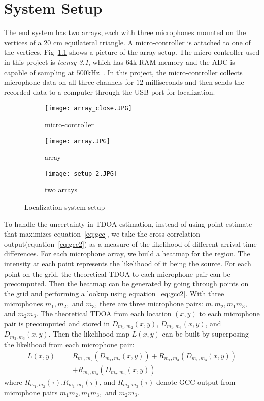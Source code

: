 \chapter{System Setup}
The end system has two arrays, each with three microphones mounted on the vertices of a $20$ cm equilateral triangle. A micro-controller is attached to one of the vertices. Fig~\ref{fig:setup_array} shows a picture of the array setup. The micro-controller used in this project is \emph{teensy 3.1}, which has $64$k RAM memory and the ADC is capable of sampling at $500$kHz~\cite{tdoa:micloc, sys:teensy}. In this project, the micro-controller collects microphone data on all three channels for $12$ milliseconds and then sends the recorded data to a computer through the USB port for localization. 

\begin{figure}[]
  \centering
  \begin{subfigure}[]{.48\textwidth}
    \texttt{[image: array\_close.JPG]}
    \caption{micro-controller}
  \end{subfigure}
  \begin{subfigure}[]{.48\textwidth}
    \texttt{[image: array.JPG]}
    \caption{array}
  \end{subfigure}
  \begin{subfigure}[]{.48\textwidth}
    \texttt{[image: setup\_2.JPG]}
    \caption{two arrays}
  \end{subfigure}
  \caption{Localization system setup}
  \label{fig:setup_array}
\end{figure}

To handle the uncertainty in TDOA estimation, instead of using point estimate that maximizes equation~\ref{eq:gcc}, we take the cross-correlation output(equation~\ref{eq:gcc2}) as a measure of the likelihood of different arrival time differences. For each microphone array, we build a heatmap for the region. The intensity at each point represents the likelihood of it being the source. For each point on the grid, the theoretical TDOA to each microphone pair can be precomputed. Then the heatmap can be generated by going through points on the grid and performing a lookup using equation~\ref{eq:gcc2}. With three microphones $m_1,m_2,$ and $m_3$, there are three microphone pairs: $m_1m_2,m_1m_3,$ and $m_2m_3$. The theoretical TDOA from each location $(x,y)$ to each microphone pair is precomputed and stored in $D_{m_1,m_2}(x,y)$, $D_{m_1,m_3}(x,y)$, and $D_{m_2,m_3}(x,y)$. Then the likelihood map $L(x,y)$ can be built by superposing the likelihood from each microphone pair:
\begin{eqnarray*}
L(x,y) &=& R_{m_1,m_2}(D_{m_1,m_2}(x,y)) + R_{m_1,m_3}(D_{m_1,m_3}(x,y)) \\
 & & +R_{m_2,m_3}(D_{m_2,m_3}(x,y)) 
\end{eqnarray*}
where $R_{m_1,m_2}(\tau)$,$R_{m_1,m_3}(\tau)$, and $R_{m_2,m_3}(\tau)$ denote GCC output from microphone pairs $m_1m_2,m_1m_3,$ and $m_2m_3$.

